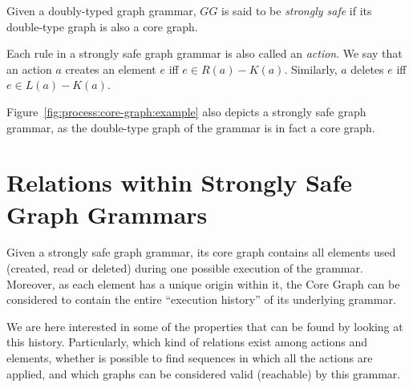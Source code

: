 \begin{definition} Given \doublyTypedGraphGrammarCore{} a doubly-typed graph grammar, $GG$ is said to be \emph{strongly safe} if its double-type graph is also a core graph.

  Each rule in a strongly safe graph grammar is also called an \emph{action}. We say that an action $a$ creates an element $e$ iff $e \in R(a) - K(a)$. Similarly, $a$ deletes $e$ iff \mbox{$e \in L(a) - K(a)$}.
\end{definition}

\begin{example} Figure~\ref{fig:process:core-graph:example} also depicts a strongly safe graph grammar, as the double-type graph of the grammar is in fact a core graph.
\end{example}

\section{Relations within Strongly Safe Graph Grammars}

Given a strongly safe graph grammar, its core graph contains all elements used (created, read or deleted) during one possible execution of the grammar. Moreover, as each element has a unique origin within it, the Core Graph can be considered to contain the entire ``execution history'' of its underlying grammar. 

We are here interested in some of the properties that can be found by looking at this history. Particularly, which kind of relations exist among actions and elements, whether is possible to find sequences in which all the actions are applied, and which graphs can be considered valid (reachable) by this grammar.

